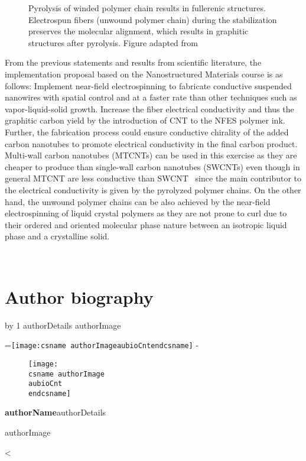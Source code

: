 \documentclass[11pt]{article}
\makeatletter
\newcounter{aubio}
\newcommand{\checkheight}[1]{%
  \par \penalty-100\begingroup%
  \setbox8=\hbox{#1}%
  \setlength{\dimen@}{\ht8}%
  \dimen@ii\pagegoal \advance\dimen@ii-\pagetotal
  \ifdim \dimen@>\dimen@ii
    \break
  \fi\endgroup}
\def\printBio{%
  \@tempcnta=0
   \loop
     \advance \@tempcnta by 1
     \def\aubioCnt{\the\@tempcnta}
     \setlength{\intextsep}{0pt}%
     \setlength{\columnsep}{10pt}%
     \newbox\boxa%
     \setbox\boxa\vbox{\csname authorDetails\aubioCnt\endcsname}
     \expandafter\ifx\csname authorImage\aubioCnt\endcsname\relax%
      \else%
       \checkheight{\texttt{[image: \\csname authorImage\\aubioCnt\\endcsname]}}
        \begin{wrapfigure}{l}{25mm}
         \texttt{[image: \\csname authorImage\\aubioCnt\\endcsname]}%
        \end{wrapfigure}\par
      \fi
     {\parindent0pt\textbf{\csname authorName\aubioCnt\endcsname}\csname authorDetails\aubioCnt\endcsname \par\bigskip%
     \expandafter\ifx\csname authorImage\aubioCnt\endcsname\relax\else%
      \ifdim\the\ht\boxa < 90pt\vskip\dimexpr(90pt -\the\ht\boxa-1pc)\fi%
     \fi}%
      \ifnum\@tempcnta < \theaubio
   \repeat
   }
\def\fixFloatSize#1{}%
\makeatother
\begin{document}
\bgroup
\fixFloatSize{images/2a93083c-6cef-4179-919f-050d684ff601-ufullerenengraphene.png}
\begin{figure*}[!htbp]
\centering \makeatletter{}
\makeatother 
\caption{Pyrolysis of winded polymer chain results in fullerenic structures. Electrospun fibers (unwound polymer chain) during the stabilization preserves the molecular alignment, which results in graphitic structures after pyrolysis. Figure adapted from\unskip~\protect\cite{691550:18855236}}
\label{f-db248f05c2b3}
\end{figure*}
\egroup
From the previous statements and results from scientific literature, the implementation proposal based on the Nanostructured Materials course is as follows: Implement near-field electrospinning to fabricate conductive suspended nanowires with spatial control and at a faster rate than other techniques such as vapor-liquid-solid growth. Increase the fiber electrical conductivity and thus the graphitic carbon yield by the introduction of CNT to the NFES polymer ink. Further, the fabrication process could ensure conductive chirality of the added carbon nanotubes to promote electrical conductivity in the final carbon product. Multi-wall carbon nanotubes (MTCNTs) can be used in this exercise as they are cheaper to produce than single-wall carbon nanotubes (SWCNTs) even though in general MTCNT are less conductive than SWCNT\unskip~\cite{691550:18856327}  since the main contributor to the electrical conductivity is given by the pyrolyzed polymer chains. On the other hand, the unwound polymer chains can be also achieved by the near-field electrospinning of liquid crystal polymers as they are not prone to curl due to their ordered and oriented molecular phase nature between an isotropic liquid phase and a crystalline solid.

~ \clearpage 
    





\section*{Author biography}

\printBio 
\end{document}
